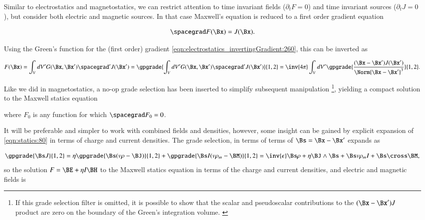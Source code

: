 %
%

Similar to electrostatics and magnetostatics, we can restrict attention to time invariant fields (\( \partial_t F = 0\)) and time invariant sources (\(\partial_t J = 0\)), but consider both electric and magnetic sources.  In that case Maxwell's equation is reduced to a first order gradient equation

\begin{dmath}\label{eqn:statics:20}
\spacegrad F(\Bx) = J(\Bx).
\end{dmath}

Using the Green's function for the (first order) gradient \cref{eqn:electrostatics_invertingGradient:260}, this can be inverted as

\begin{dmath}\label{eqn:statics:40}
F(\Bx)
= \int_V dV' G(\Bx, \Bx') \spacegrad' J(\Bx')
= \gpgrade{\int_V dV' G(\Bx, \Bx') \spacegrad' J(\Bx')}{1,2}
= \inv{4\pi} \int_V dV' \gpgrade{\frac{(\Bx - \Bx') J(\Bx')}{\Norm{\Bx - \Bx'}^3} }{1,2}.
\end{dmath}

Like we did in magnetostatics, a no-op grade selection has been inserted to simplify subsequent manipulation
\footnote{If this grade selection filter is omitted, it is possible to show that the scalar and pseudoscalar contributions to the \( (\Bx -\Bx') J \) product are zero on the boundary of the Green's integration volume. \citep{jancewicz1988multivectors:appendixI}},
yielding a compact solution to the Maxwell statics equation


where \( F_0 \) is any function for which \( \spacegrad F_0 = 0 \).

It will be preferable and simpler to work with combined fields and densities, however, some insight can be gained by
explicit expansion of \cref{eqn:statics:80} in terms of charge and current densities.
The grade selection, in terms of terms of \( \Bs = \Bx -\Bx' \) expands as

\begin{dmath}\label{eqn:statics:60}
\gpgrade{\Bs J}{1,2}
=
\eta \gpgrade{\Bs (v \rho - \BJ)}{1,2}
+
\gpgrade{\Bs I(v \rho_m - \BM)}{1,2}
=
\inv{\epsilon} \Bs \rho + \eta \BJ \wedge \Bs + \Bs v \rho_m I + \Bs \cross \BM,
\end{dmath}
so the solution \( F = \BE + \eta I \BH \) to the Maxwell statics equation in terms of the charge and current densities, and electric and magnetic fields is

